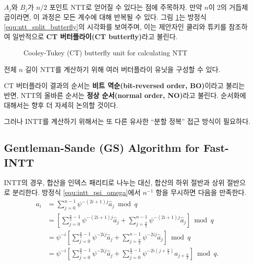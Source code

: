 $A_j$와 $B_j$가 $n/2$ 포인트 NTT로 얻어질 수 있다는 점에 주목하자. 만약 $n$이 2의 거듭제곱이라면, 이 과정은 모든 계수에 대해 반복될 수 있다. 그림 \ref{fig:ct_butterfly}는 방정식 \ref{equ:ntt_split_butterfly}의 시각화를 보여주며, 이는 제안자인 쿨리와 튜키를 참조하여 일반적으로 \textbf{CT 버터플라이(CT butterfly)}라고 불린다.
\begin{figure}[H]
\centering
{}
\caption{Cooley-Tukey (CT) butterfly unit for calculating NTT}
\label{fig:ct_butterfly}
\end{figure}

전체 $n$ 길이 NTT를 계산하기 위해 여러 버터플라이 유닛을 구성할 수 있다.

CT 버터플라이 결과의 순서는 \textbf{비트 역순(bit-reversed order, BO)}이라고 불리는 반면, NTT의 올바른 순서는 \textbf{정상 순서(normal order, NO)}라고 불린다. 순서화에 대해서는 향후 더 자세히 논의할 것이다.

그러나 INTT를 계산하기 위해서는 또 다른 유사한 ``분할 정복'' 접근 방식이 필요하다.

\subsection{Gentleman-Sande (GS) Algorithm for Fast-INTT}
\label{sec:gs_algorithm}

INTT의 경우, 합산을 인덱스 패리티로 나누는 대신, 합산의 하위 절반과 상위 절반으로 분리한다. 방정식 \ref{equ:intt_psi_omega}에서 $n^{-1}$ 항을 무시하면 다음을 만족한다.
\begin{equation}
\begin{split}
a_i &= \sum_{j=0}^{n-1} \psi^{-(2i+1)j}\hat{a}_j \bmod q \\
&= \left[ \sum_{j=0}^{\frac{n}{2}-1} \psi^{-(2i+1)j}\hat{a}_j + \sum_{j=\frac{n}{2}}^{n-1} \psi^{-(2i+1)j}\hat{a}_j \right] \bmod q \\
&= \psi^{-i} \left[ \sum_{j=0}^{\frac{n}{2}-1} \psi^{-2ij}\hat{a}_j + \sum_{j=\frac{n}{2}}^{n-1} \psi^{-2ij}\hat{a}_j \right] \bmod q \\
&= \psi^{-i} \left[ \sum_{j=0}^{\frac{n}{2}-1} \psi^{-2ij}\hat{a}_j + \sum_{j=0}^{\frac{n}{2}-1} \psi^{-2i(j+\frac{n}{2})}\hat{a}_{j+\frac{n}{2}} \right] \bmod q.
\end{split}
\end{equation}

